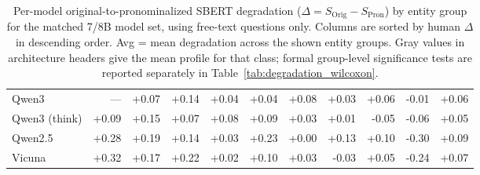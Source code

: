 \begin{table}[h]
\begin{tabular}{>{\raggedright\arraybackslash}p{2.1cm}rrrrrrrrrr}
\midrule
Qwen3 & --- & +0.07 & +0.14 & +0.04 & +0.04 & +0.08 & +0.03 & +0.06 & -0.01 & +0.06 \\
Qwen3 (think) & +0.09 & +0.15 & +0.07 & +0.08 & +0.09 & +0.03 & +0.01 & -0.05 & -0.06 & +0.05 \\
Qwen2.5 & +0.28 & +0.19 & +0.14 & +0.03 & +0.23 & +0.00 & +0.13 & +0.10 & -0.30 & +0.09 \\
Vicuna & +0.32 & +0.17 & +0.22 & +0.02 & +0.10 & +0.03 & -0.03 & +0.05 & -0.24 & +0.07 \\
\bottomrule
\end{tabular}
\caption{Per-model original-to-pronominalized SBERT degradation ($\Delta = S_\mathrm{Orig} - S_\mathrm{Pron}$) by entity group for the matched 7/8B model set, using free-text questions only. Columns are sorted by human $\Delta$ in descending order. Avg = mean degradation across the shown entity groups. Gray values in architecture headers give the mean profile for that class; formal group-level significance tests are reported separately in Table~\ref{tab:degradation_wilcoxon}.}
\label{tab:ent_degradation_per_model}
\end{table}
